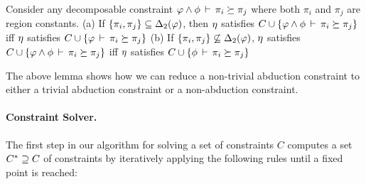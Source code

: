 \begin{lemma}
  \label{lemma:decomposition}
  Consider any decomposable constraint  $\varphi \wedge \phi\,\vdash\,\pi_i \succeq \pi_j$
where both $\pi_i$ and $\pi_j$ are region constants.
(a) If $\{ \pi_i, \pi_j \} \subseteq {\Delta_2}(\varphi)$,
then $\eta$ satisfies $C \cup \{ \varphi \wedge \phi\,\vdash\,\pi_i \succeq \pi_j \}$
iff
$\eta$ satisfies $C \cup \{ \varphi\,\vdash\,\pi_i \succeq \pi_j \}$
  (b) If $\{ \pi_i, \pi_j \} \not \subseteq {\Delta_2}(\varphi)$,
$\eta$ satisfies $C \cup \{ \varphi \wedge \phi\,\vdash\,\pi_i \succeq \pi_j \}$
iff
$\eta$ satisfies $C \cup \{ \phi\,\vdash\,\pi_i \succeq \pi_j \}$
\end{lemma}

The above lemma shows how we can reduce a non-trivial abduction constraint to
either a trivial abduction constraint or a non-abduction constraint.

\paragraph{Constraint Solver.}
The first step in our algorithm for solving a set of constraints $C$
computes a set ${C}^* \supseteq C$ of constraints by iteratively applying
the following rules until a fixed point is reached:

